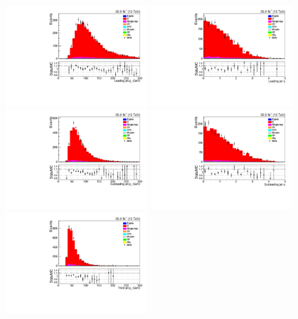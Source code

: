 \begin{figure}[h]
\centering
\includegraphics[width=0.47\textwidth]{figs/background-estimation/plots/unblinded/ttbar_control/leadingJetPt_SingleTop_wMass_emu.pdf}
\includegraphics[width=0.47\textwidth]{figs/background-estimation/plots/unblinded/ttbar_control/leadingJetEta_SingleTop_wMass_emu.pdf}
\\
\includegraphics[width=0.47\textwidth]{figs/background-estimation/plots/unblinded/ttbar_control/secondJetPt_SingleTop_wMass_emu.pdf}
\includegraphics[width=0.47\textwidth]{figs/background-estimation/plots/unblinded/ttbar_control/secondJetEta_SingleTop_wMass_emu.pdf}
\\
\includegraphics[width=0.47\textwidth]{figs/background-estimation/plots/unblinded/ttbar_control/thirdJetPt_SingleTop_wMass_emu.pdf}

\end{figure}
